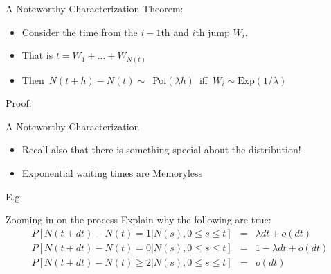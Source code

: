 \documentclass[11pt]{beamer}
\begin{document}
\begin{frame}{A Noteworthy Characterization} 
\vspace{-3 cm}
Theorem: 
\begin{itemize}

\item Consider the time from the $i-1$th and $i$th jump $W_i$. 

\item That is $t=W_1 + ... + W_{N(t)}$

\item Then~$N(t+h)-N(t)\sim$~Poi$(\lambda h)$~iff~$W_i \sim\text{Exp}(1/\lambda)$

\end{itemize}
Proof:


\end{frame}
\begin{frame}

\end{frame}
\begin{frame}{A Noteworthy Characterization}
\vspace{-3 cm}
\begin{itemize}
\item Recall also that there is something special about the  distribution!
\item Exponential waiting times are \alert{Memoryless}
\end{itemize}
E.g: 




\end{frame}
\begin{frame}{Zooming in on the process}
\vspace{- 2 cm}
Explain why the following are true:
\begin{eqnarray*}
P\left[ N\left( t+dt\right) -N\left( t\right) =1\left\vert N\left(s\right),0\leq s\leq t\right. \right]  &=&\lambda dt+o(dt) \\
P\left[ N\left( t+dt\right) -N\left( t\right) =0\left\vert N\left(s\right),0\leq s\leq t\right. \right]  &=&1-\lambda dt +o(dt)\\
P\left[ N\left( t+dt\right) -N\left( t\right) \geq 2\left\vert N\left( s\right) ,0\leq s\leq t\right. \right]  &=&o(dt)
\end{eqnarray*}
\vfill
\end{frame}
\end{document}
